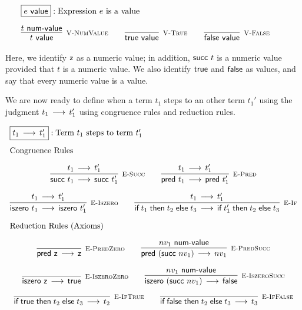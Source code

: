 \[
\begin{array}{c}
\multicolumn{1}{l}{\fbox{$e \Value$}: \mbox{Expression $e$ is a value}}\\[1em]
\infer[\VNumValue]{t \Value}{t \NumValue} \qquad
\infer[\VTrue]{\tmtrue \Value}{} \qquad
\infer[\VFalse]{\tmfalse \Value}{} \qquad
\end{array}
\]

Here, we identify $\textsf{z}$ as a numeric value; in addition, $\textsf{succ}~t$ is a
numeric value provided that $t$ is a numeric value. We also identify $\textsf{true}$
and $\textsf{false}$ as values, and say that every numeric value is a value.

We are now ready to define when a term $t_1$ steps to an other term $t_1'$ using
the judgment $t_1 \mathrel{\,\longrightarrow\,} t_1'$ using congruence rules and reduction rules.

\[
\begin{array}{c}
\multicolumn{1}{l}{\fbox{$t_1 \Steps t_1'$}: \mbox{Term $t_1$ steps to term $t_1'$}}
\\[1em]
\multicolumn{1}{l}{\mbox{\text{Congruence Rules}}}
\\[1em]
\infer[\ESucc]{\tmsucc t_1 \Steps \tmsucc t_1'}{t_1 \Steps t_1'}\qquad
\infer[\EPred]{\tmpred t_1 \Steps \tmpred t_1'}{t_1 \Steps t_1'}
\\[1em]
\infer[\EIsZero]{\tmiszero t_1 \Steps \tmiszero t_1'}{t_1 \Steps t_1'}\qquad
\infer[\EIf]{\tmif{t_1}{t_2}{t_3} \Steps \tmif{t_1'}{t_2}{t_3}}{t_1 \Steps t_1'}
\\[1em]
\multicolumn{1}{l}{\mbox{\text{Reduction Rules (Axioms)}}}
\\[1em]
\infer[\EPredZ]{\tmpred \tmzero \Steps \tmzero}{}\qquad
\infer[\EPredSucc]{\tmpred (\tmsucc nv_1) \Steps nv_1}{nv_1 \NumValue}
\\[1em]
\infer[\EIsZeroZ]{\tmiszero \tmzero \Steps \tmtrue}{} \qquad
\infer[\EIsZeroSucc]{\tmiszero (\tmsucc nv_1) \Steps \tmfalse}{nv_1 \NumValue}
\\[1em]
\infer[\EIfT]{\tmif \tmtrue {t_2}{t_3} \Steps t_2}{}\qquad
\infer[\EIfF]{\tmif \tmfalse {t_2}{t_3} \Steps t_3}{}
\end{array}
\]


